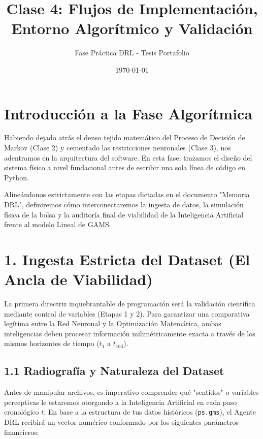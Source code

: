 \documentclass[11pt,a4paper]{article}
\title{\textbf{Clase 4: Flujos de Implementación, Entorno Algorítmico y Validación}}
\author{Fase Práctica DRL - Tesis Portafolio}
\date{\today}
\begin{document}
\maketitle

\section*{Introducción a la Fase Algorítmica}
Habiendo dejado atrás el denso tejido matemático del Proceso de Decisión de Markov (Clase 2) y cementado las restricciones neuronales (Clase 3), nos adentramos en la arquitectura del software. En esta fase, trazamos el diseño del sistema físico a nivel fundacional antes de escribir una sola línea de código en Python. 

Alineándonos estrictamente con las etapas dictadas en el documento "Memoria DRL", definiremos cómo interconectaremos la ingesta de datos, la simulación física de la bolsa y la auditoría final de viabilidad de la Inteligencia Artificial frente al modelo Lineal de GAMS.

\section{1. Ingesta Estricta del Dataset (El Ancla de Viabilidad)}
La primera directriz inquebrantable de programación será la validación científica mediante control de variables (Etapas 1 y 2). Para garantizar una comparativa legítima entre la Red Neuronal y la Optimización Matemática, ambas inteligencias deben procesar información milimétricamente exacta a través de los mismos horizontes de tiempo ($t_1$ a $t_{163}$).

\subsection{1.1 Radiografía y Naturaleza del Dataset}
Antes de manipular archivos, es imperativo comprender qué "sentidos" o variables perceptivas le estaremos otorgando a la Inteligencia Artificial en cada paso cronológico $t$. En base a la estructura de tus datos históricos (\texttt{ps.gms}), el Agente DRL recibirá un vector numérico conformado por los siguientes parámetros financieros:
\end{document}
